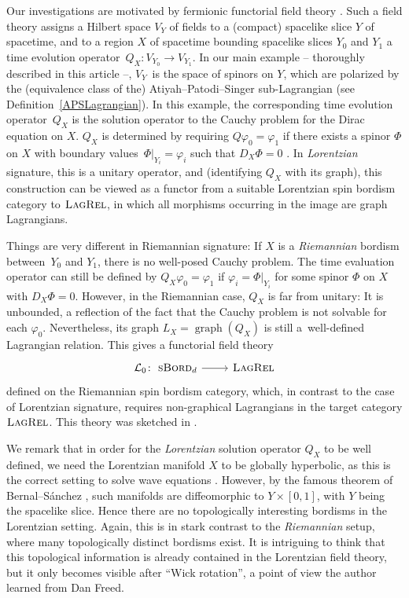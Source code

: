 \documentclass[pdftex]{sigma}
\numberwithin{equation}{section}
\DeclareMathOperator{\graph}{\mathrm{graph}}
\newcommand{\LagRel}{\textsc{LagRel}}
\newcommand{\sBord}{\textsc{sBord}}
\begin{document}
Our investigations are motivated by fermionic functorial field theory \cite{DaiFreed, FreedLectures, LudewigRoos, StolzTeichnerElliptic, StolzTeichnerSusy}.
Such a field theory assigns a Hilbert space $V_Y$ of fields to a (compact) spacelike slice $Y$ of spacetime, and to a region $X$ of spacetime bounding spacelike slices $Y_0$ and $Y_1$ a time evolution operator~$Q_X\colon V_{Y_0} \to V_{Y_1}$.
In our main example -- thoroughly described in this article --, $V_Y$~is the space of spinors on $Y$, which are polarized by the (equivalence class of the) Atiyah--Patodi--Singer sub-Lagrangian (see Definition~\ref{APSLagrangian}).
In this example, the corresponding time evolution operator~$Q_X$ is the solution operator to the Cauchy problem for the Dirac equation on $X$.
$Q_X$ is determined by requiring $Q \varphi_0 = \varphi_1$ if there exists a spinor $\Phi$ on $X$ with boundary values~${\Phi|_{Y_i} = \varphi_i}$ such that $D_X \Phi = 0$ \cite[Section~2]{BaerStrohmaier}.
In \emph{Lorentzian} signature, this is a unitary operator, and (identifying $Q_X$ with its graph), this construction can be viewed as a functor from a suitable Lorentzian spin bordism category to $\LagRel$, in which all morphisms occurring in the image are graph Lagrangians.

Things are very different in Riemannian signature: If $X$ is a \emph{Riemannian} bordism between~$Y_0$ and $Y_1$, there is no well-posed Cauchy problem.
The time evaluation operator can still be defined by $Q_X\varphi_0 = \varphi_1$ if $\varphi_i = \Phi|_{Y_i}$ for some spinor $\Phi$ on $X$ with $D_X \Phi = 0$.
However, in the Riemannian case, $Q_X$ is far from unitary:
It is unbounded, a reflection of the fact that the Cauchy problem is not solvable for each $\varphi_0$.
Nevertheless, its graph $L_X = \graph(Q_X)$ is still a~well-defined Lagrangian relation.
This gives a functorial field theory
\begin{equation}
\label{FieldTheoryIntro}
\begin{tikzcd}
 \mathcal{L}_0\colon\ \sBord_d \ar[r] & \LagRel
\end{tikzcd}
\end{equation}
defined on the Riemannian spin bordism category, which, in contrast to the case of Lorentzian signature, requires non-graphical Lagrangians in the target category $\LagRel$.
This theory was sketched in \cite[Remark~3.16]{LudewigRoos}.

We remark that in order for the \emph{Lorentzian} solution operator $Q_X$ to be well defined, we need the Lorentzian manifold $X$ to be globally hyperbolic, as this is the correct setting to solve wave equations \cite{BGP}.
However, by the famous theorem of Bernal--S\'anchez \cite{BernalSanchez}, such manifolds are diffeomorphic to $Y \times [0, 1]$, with $Y$ being the spacelike slice.
Hence there are no topologically interesting bordisms in the Lorentzian setting.
Again, this is in stark contrast to the \emph{Riemannian} setup, where many topologically distinct bordisms exist.
It is intriguing to think that this topological information is already contained in the Lorentzian field theory, but it only becomes visible after ``Wick rotation'', a point of view the author learned from Dan Freed.
\end{document}
